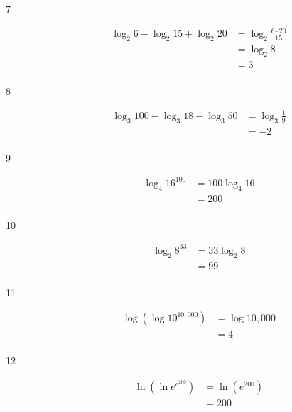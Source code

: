 \documentclass{exam}
\begin{document}
\begin{description}
      \item[7] 
        \begin{align*}
          \log_2 6 - \log_2 15 + \log_2 20 &= \log_2 \frac{6 \cdot 20}{15} \\
                                           &= \log_2 8 \\
                                           &= \boxed{3} \\
        \end{align*}

      \item[8] 
        \begin{align*}
          \log_3 100 - \log_3 18 - \log_3 50 &= \log_3 \frac{1}{9} \\
                                             &= \boxed{-2} \\
        \end{align*}

      \item[9] 
        \begin{align*}
          \log_4 16^{100} &= 100 \log_4 16 \\
                          &= \boxed{200} \\
        \end{align*}

      \item[10] 
        \begin{align*}
          \log_2 8^{33} &= 33 \log_2 8 \\
                        &= \boxed{99} \\
        \end{align*}

      \item[11] 
        \begin{align*}
          \log \left( \log 10^{10,000} \right) &= \log 10,000 \\
                                               &= \boxed{4} \\
        \end{align*}

      \item[12] 
        \begin{align*}
          \ln \left( \ln e^{e^{200}} \right) &= \ln \left( e^{200} \right) \\
                                             &= \boxed{200} \\
        \end{align*}


\end{description}
\end{document}
